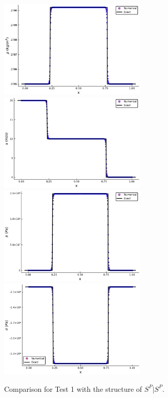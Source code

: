 \documentclass{article}
\numberwithin{equation}{section}
\numberwithin{table}{section}
\begin{document}
\begin{figure}[ht]
  \centering

\includegraphics[width= 7cm] {case1rho.pdf}
\includegraphics[width= 7cm] {case1u.pdf}
\includegraphics[width= 7cm] {case1p.pdf}
\includegraphics[width= 7cm] {case1sigma.pdf}

    \caption{Comparison for Test 1 with the structure of $S^P|S^P$.  }
  \label{fig:case1}
\end{figure}
\end{document}

